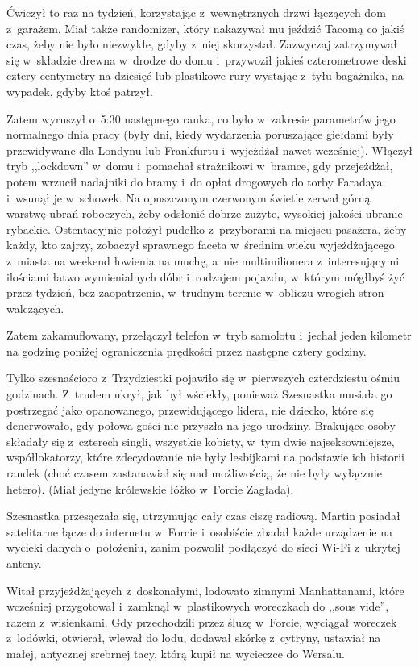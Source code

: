 \documentclass[oneside,polish,11pt,sfheadings]{mwbk}
\begin{document}
Ćwiczył to raz na tydzień, korzystając z~wewnętrznych drzwi łączących
dom z~garażem. Miał także randomizer, który nakazywał mu jeździć Tacomą
co jakiś czas, żeby nie było niezwykłe, gdyby z~niej skorzystał.
Zazwyczaj zatrzymywał się w~składzie drewna w~drodze do domu i~przywoził
jakieś czterometrowe deski cztery centymetry na dziesięć lub plastikowe
rury wystając z~tyłu bagażnika, na wypadek, gdyby ktoś patrzył.

Zatem wyruszył o~5:30 następnego ranka, co było w~zakresie parametrów
jego normalnego dnia pracy (były dni, kiedy wydarzenia poruszające
giełdami były przewidywane dla Londynu lub Frankfurtu i~wyjeżdżał nawet
wcześniej). Włączył tryb ,,lockdown'' w~domu i~pomachał strażnikowi w~bramce, gdy przejeżdżał, potem wrzucił nadajniki do bramy i~do opłat
drogowych do torby Faradaya i~wsunął je w~schowek. Na opuszczonym
czerwonym świetle zerwał górną warstwę ubrań roboczych, żeby odsłonić
dobrze zużyte, wysokiej jakości ubranie rybackie. Ostentacyjnie położył
pudełko z~przyborami na miejscu pasażera, żeby każdy, kto zajrzy,
zobaczył sprawnego faceta w~średnim wieku wyjeżdżającego z~miasta na
weekend łowienia na muchę, a~nie multimilionera z~interesującymi
ilościami łatwo wymienialnych dóbr i~rodzajem pojazdu, w~którym mógłbyś
żyć przez tydzień, bez zaopatrzenia, w~trudnym terenie w~obliczu wrogich
stron walczących.

Zatem zakamuflowany, przełączył telefon w~tryb samolotu i~jechał jeden
kilometr na godzinę poniżej ograniczenia prędkości przez następne cztery
godziny.

Tylko szesnaścioro z~Trzydziestki pojawiło się w~pierwszych czterdziestu
ośmiu godzinach. Z~trudem ukrył, jak był wściekły, ponieważ Szesnastka
musiała go postrzegać jako opanowanego, przewidującego lidera, nie
dziecko, które się denerwowało, gdy połowa gości nie przyszła na jego
urodziny. Brakujące osoby składały się z~czterech singli, wszystkie
kobiety, w~tym dwie najseksowniejsze, współlokatorzy, które zdecydowanie
nie były lesbijkami na podstawie ich historii randek (choć czasem
zastanawiał się nad możliwością, że nie były wyłącznie hetero). (Miał
jedyne królewskie łóżko w~Forcie Zagłada).

Szesnastka przesączała się, utrzymując cały czas ciszę radiową. Martin
posiadał satelitarne łącze do internetu w~Forcie i~osobiście zbadał
każde urządzenie na wycieki danych o~położeniu, zanim pozwolił podłączyć
do sieci Wi-Fi z~ukrytej anteny.

Witał przyjeżdżających z~doskonałymi, lodowato zimnymi Manhattanami,
które wcześniej przygotował i~zamknął w~plastikowych woreczkach do
,,sous vide'', razem z~wisienkami. Gdy przechodzili przez śluzę w~Forcie, wyciągał woreczek z~lodówki, otwierał, wlewał do lodu, dodawał
skórkę z~cytryny, ustawiał na małej, antycznej srebrnej tacy, którą
kupił na wycieczce do Wersalu.
\end{document}
